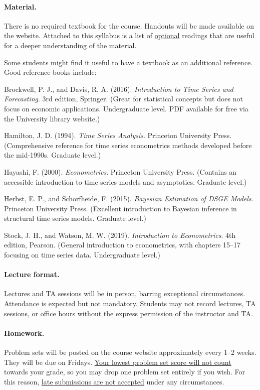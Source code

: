 \documentclass[12pt]{article}
\begin{document}
\paragraph{Material.}
There is no required textbook for the course. Handouts will be made available on the website. Attached to this syllabus is a list of \underline{optional} readings that are useful for a deeper understanding of the material.

Some students might find it useful to have a textbook as an additional reference. Good reference books include:
\begin{description}
\item Brockwell, P. J., and Davis, R. A. (2016). \emph{Introduction to Time Series and Forecasting}. 3rd edition, Springer. (Great for statistical concepts but does not focus on economic applications. Undergraduate level. PDF available for free via the University library website.)
\item Hamilton, J. D. (1994). \emph{Time Series Analysis}. Princeton University Press. (Comprehensive reference for time series econometrics methods developed before the mid-1990s. Graduate level.)
\item Hayashi, F. (2000). \emph{Econometrics}. Princeton University Press. (Contains an accessible introduction to time series models and asymptotics. Graduate level.)
\item Herbst, E. P., and Schorfheide, F. (2015). \emph{Bayesian Estimation of DSGE Models}. Princeton University Press. (Excellent introduction to Bayesian inference in structural time series models. Graduate level.)
\item Stock, J. H., and Watson, M. W. (2019). \emph{Introduction to Econometrics}. 4th edition, Pearson. (General introduction to econometrics, with chapters 15--17 focusing on time series data. Undergraduate level.)
\end{description}

\paragraph{Lecture format.}
Lectures and TA sessions will be in person, barring exceptional circumstances. Attendance is expected but not mandatory. Students may not record lectures, TA sessions, or office hours without the express permission of the instructor and TA.

\paragraph{Homework.}
Problem sets will be posted on the course website approximately every 1--2 weeks. They will be due on Fridays. \underline{Your lowest problem set score will not count} towards your grade, so you may drop one problem set entirely if you wish. For this reason, \underline{late submissions are not accepted} under any circumstances.
\end{document}
